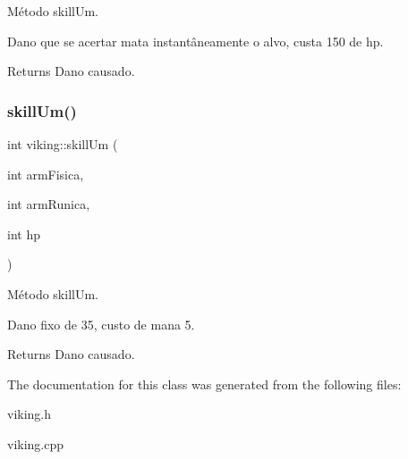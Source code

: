 Método skill\+Um. 

Dano que se acertar mata instantâneamente o alvo, custa 150 de hp. \begin{DoxyReturn}{Returns}
Dano causado. 
\end{DoxyReturn}
\mbox{\label{classviking_a433998767ad855cbfa152c1b0f32363e}} 
\subsubsection{\texorpdfstring{skill\+Um()}{skillUm()}}
{\footnotesize\ttfamily int viking\+::skill\+Um (\begin{DoxyParamCaption}\item[{int}]{arm\+Fisica,  }\item[{int}]{arm\+Runica,  }\item[{int}]{hp }\end{DoxyParamCaption})}



Método skill\+Um. 

Dano fixo de 35, custo de mana 5. \begin{DoxyReturn}{Returns}
Dano causado. 
\end{DoxyReturn}


The documentation for this class was generated from the following files\+:\begin{DoxyCompactItemize}
\item 
viking.\+h\item 
viking.\+cpp\end{DoxyCompactItemize}
